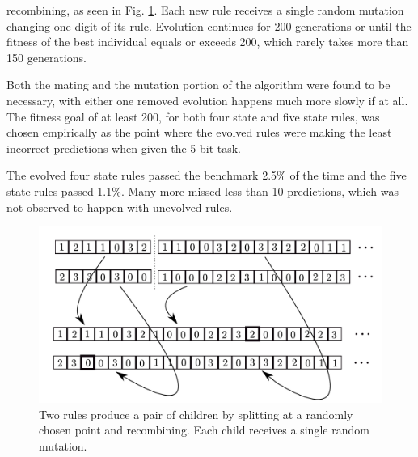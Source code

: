 \documentclass{elsarticle}
\begin{document}
\begin{multicols}{2}
	recombining, as seen in Fig.  \ref{GA}. Each new rule receives a 
	single random mutation changing one digit of its rule.  Evolution 
	continues for 200 generations or until the fitness of the best 
	individual equals or exceeds 200, which rarely takes more than 150 
	generations.  \par Both the mating and the mutation portion of the 
	algorithm were found to be necessary, with either one removed 
	evolution happens much more slowly if at all. The fitness goal of 
	at least 200, for both four state and five state rules, was chosen 
	empirically as the point where the evolved rules were making the 
	least incorrect predictions when given the 5-bit task.  \par
	The evolved four state rules passed the benchmark 2.5\% of the time and 
	the five state rules passed 1.1\%. Many more missed less than 10 
	predictions, which was not observed to happen with unevolved rules.
	
	
	\begin{figure}[H]
		\centering
		\includegraphics[width=\linewidth]{GA.pdf}
		\caption{Two rules produce a pair of children by splitting at a randomly 
			chosen point and recombining. Each child receives a single random 
		mutation.}
		\label{GA}
	\end{figure}
	

\end{multicols}
\end{document}
